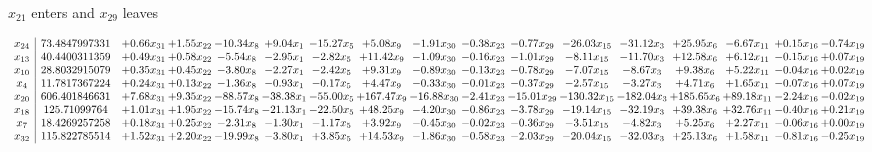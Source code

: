 \documentclass[9pt]{article}
\begin{document}
 $ x_{21} $ enters and $ x_{29} $ leaves 

 \[\begin{array}{c| c c@{\hskip 2pt} c@{\hskip 2pt} c@{\hskip 2pt} c@{\hskip 2pt} c@{\hskip 2pt} c@{\hskip 2pt} c@{\hskip 2pt} c@{\hskip 2pt} c@{\hskip 2pt} c@{\hskip 2pt} c@{\hskip 2pt} c@{\hskip 2pt} c@{\hskip 2pt} c@{\hskip 2pt} c@{\hskip 2pt} }
 x_{24}   &  73.4847997331 & +  0.66 x_{31} & +  1.55 x_{22} & -10.34 x_{8} & +  9.04 x_{1} & -15.27 x_{5} & +  5.08 x_{9} & -1.91 x_{30} & -0.38 x_{23} & -0.77 x_{29} & -26.03 x_{15} & -31.12 x_{3} & + 25.95 x_{6} & -6.67 x_{11} & +  0.15 x_{16} & -0.74 x_{19}\\
 x_{13}   &  40.4400311359 & +  0.49 x_{31} & +  0.58 x_{22} & -5.54 x_{8} & -2.95 x_{1} & -2.82 x_{5} & + 11.42 x_{9} & -1.09 x_{30} & -0.16 x_{23} & -1.01 x_{29} & -8.11 x_{15} & -11.70 x_{3} & + 12.58 x_{6} & +  6.12 x_{11} & -0.15 x_{16} & +  0.07 x_{19}\\
 x_{10}   &  28.8032915079 & +  0.35 x_{31} & +  0.45 x_{22} & -3.80 x_{8} & -2.27 x_{1} & -2.42 x_{5} & +  9.31 x_{9} & -0.89 x_{30} & -0.13 x_{23} & -0.78 x_{29} & -7.07 x_{15} & -8.67 x_{3} & +  9.38 x_{6} & +  5.22 x_{11} & -0.04 x_{16} & +  0.02 x_{19}\\
 x_{4}   &  11.7817367224 & +  0.24 x_{31} & +  0.13 x_{22} & -1.36 x_{8} & -0.93 x_{1} & -0.17 x_{5} & +  4.47 x_{9} & -0.33 x_{30} & -0.01 x_{23} & -0.37 x_{29} & -2.57 x_{15} & -3.27 x_{3} & +  4.71 x_{6} & +  1.65 x_{11} & -0.07 x_{16} & +  0.07 x_{19}\\
 x_{20}   &  606.401846631 & +  7.68 x_{31} & +  9.35 x_{22} & -88.57 x_{8} & -38.38 x_{1} & -55.00 x_{5} & + 167.47 x_{9} & -16.88 x_{30} & -2.41 x_{23} & -15.01 x_{29} & -130.32 x_{15} & -182.04 x_{3} & + 185.65 x_{6} & + 89.18 x_{11} & -2.24 x_{16} & -0.02 x_{19}\\
 x_{18}   &  125.71099764 & +  1.01 x_{31} & +  1.95 x_{22} & -15.74 x_{8} & -21.13 x_{1} & -22.50 x_{5} & + 48.25 x_{9} & -4.20 x_{30} & -0.86 x_{23} & -3.78 x_{29} & -19.14 x_{15} & -32.19 x_{3} & + 39.38 x_{6} & + 32.76 x_{11} & -0.40 x_{16} & +  0.21 x_{19}\\
 x_{7}   &  18.4269257258 & +  0.18 x_{31} & +  0.25 x_{22} & -2.31 x_{8} & -1.30 x_{1} & -1.17 x_{5} & +  3.92 x_{9} & -0.45 x_{30} & -0.02 x_{23} & -0.36 x_{29} & -3.51 x_{15} & -4.82 x_{3} & +  5.25 x_{6} & +  2.27 x_{11} & -0.06 x_{16} & +  0.00 x_{19}\\
 x_{32}   &  115.822785514 & +  1.52 x_{31} & +  2.20 x_{22} & -19.99 x_{8} & -3.80 x_{1} & +  3.85 x_{5} & + 14.53 x_{9} & -1.86 x_{30} & -0.58 x_{23} & -2.03 x_{29} & -20.04 x_{15} & -32.03 x_{3} & + 25.13 x_{6} & +  1.58 x_{11} & -0.81 x_{16} & -0.25 x_{19}\\

\end{array}\]
\end{document}
